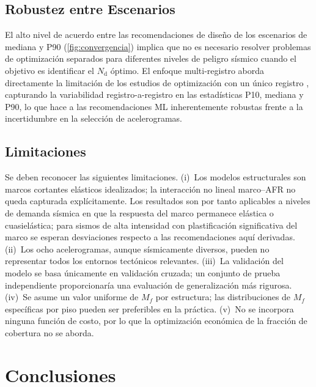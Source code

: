 \documentclass[preprint,12pt,authoryear]{elsarticle}
\newcommand{\nd}{N_{\mathrm{d}}}
\newcommand{\Mf}{M_{\!f}}
\begin{document}
\subsection{Robustez entre Escenarios}

El alto nivel de acuerdo entre las recomendaciones de diseño de los escenarios
de mediana y P90 (\cref{fig:convergencia}) implica que no es necesario
resolver problemas de optimización separados para diferentes niveles de
peligro sísmico cuando el objetivo es identificar el $\nd$ óptimo. El
enfoque multi-registro aborda directamente la limitación de los estudios de
optimización con un único registro
\citep{Jarrahi2020jbe, Jarrahi2020sdee}, capturando la variabilidad
registro-a-registro en las estadísticas P10, mediana y P90, lo que hace a
las recomendaciones ML inherentemente robustas frente a la incertidumbre en
la selección de acelerogramas.

\subsection{Limitaciones}

Se deben reconocer las siguientes limitaciones. (i)~Los modelos estructurales
son marcos cortantes elásticos idealizados; la interacción no lineal
marco--AFR no queda capturada explícitamente. Los resultados son por tanto
aplicables a niveles de demanda sísmica en que la respuesta del marco
permanece elástica o cuasielástica; para sismos de alta intensidad con
plastificación significativa del marco se esperan desviaciones respecto a las
recomendaciones aquí derivadas. (ii)~Los ocho acelerogramas, aunque
sísmicamente diversos, pueden no representar todos los entornos tectónicos
relevantes. (iii)~La validación del modelo se basa únicamente en validación
cruzada; un conjunto de prueba independiente proporcionaría una evaluación de
generalización más rigurosa. (iv)~Se asume un valor uniforme de $\Mf$ por
estructura; las distribuciones de $\Mf$ específicas por piso pueden ser
preferibles en la práctica. (v)~No se incorpora ninguna función de costo, por
lo que la optimización económica de la fracción de cobertura no se aborda.

\section{Conclusiones}
\label{sec:conclusions}
\end{document}
